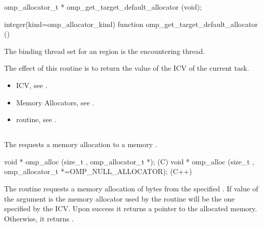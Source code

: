 \format
\ccppspecificstart
\begin{boxedcode}
omp_allocator_t * omp_get_target_default_allocator (void);
\end{boxedcode}
\ccppspecificend
\fortranspecificstart
\begin{boxedcode}
integer(kind=omp_allocator_kind) 
function omp_get_target_default_allocator ()
\end{boxedcode}
\fortranspecificend

\binding

The binding thread set for an  region is the encountering thread.

\effect

The effect of this routine is to return the value of the  ICV of the current task.

\crossreferences
\begin{itemize}
\item {} ICV, see .
\item Memory Allocators, see .
\item {} routine, see .
\end{itemize}

\ccppspecificstart


\subsection{}
\label{subsec:omp_alloc}

\summary
The  requests a memory allocation to a memory .

\format
\begin{boxedcode}
void * omp_alloc (size_t , omp_allocator_t *);  (C)
void * omp_alloc (size_t , 
           omp_allocator_t *=OMP_NULL_ALLOCATOR); (C++)
\end{boxedcode}

\effect

The  routine requests a memory allocation of  bytes from the specified . If value of the  argument is 
 the memory allocator used by the routine will be the one specified by the  ICV.
Upon success it returns a pointer to the allocated memory. Otherwise, it returns .

